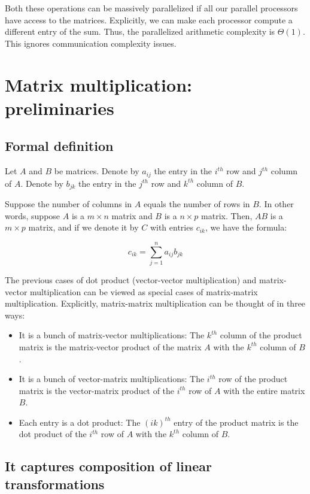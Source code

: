 \documentclass[10pt]{amsart}
\begin{document}
Both these operations can be massively parallelized if all our
parallel processors have access to the matrices. Explicitly, we can
make each processor compute a different entry of the sum. Thus, the
parallelized arithmetic complexity is $\Theta(1)$. This ignores
communication complexity issues.

\section{Matrix multiplication: preliminaries}

\subsection{Formal definition}

Let $A$ and $B$ be matrices. Denote by $a_{ij}$ the entry in the
$i^{th}$ row and $j^{th}$ column of $A$. Denote by $b_{jk}$ the entry
in the $j^{th}$ row and $k^{th}$ column of $B$.

Suppose the number of columns in $A$ equals the number of rows in
$B$. In other words, suppose $A$ is a $m \times n$ matrix and $B$ is a
$n \times p$ matrix. Then, $AB$ is a $m \times p$ matrix, and if we
denote it by $C$ with entries $c_{ik}$, we have the formula:

$$c_{ik} = \sum_{j=1}^n a_{ij}b_{jk}$$

The previous cases of dot product (vector-vector multiplication) and
matrix-vector multiplication can be viewed as special cases of
matrix-matrix multiplication. Explicitly, matrix-matrix multiplication
can be thought of in three ways:

\begin{itemize}
\item It is a bunch of matrix-vector multiplications: The $k^{th}$
  column of the product matrix is the matrix-vector product of the
  matrix $A$ with the $k^{th}$ column of $B$.
\item It is a bunch of vector-matrix multiplications: The $i^{th}$ row
  of the product matrix is the vector-matrix product of the $i^{th}$
  row of $A$ with the entire matrix $B$.
\item Each entry is a dot product: The $(ik)^{th}$ entry of the
  product matrix is the dot product of the $i^{th}$ row of $A$ with
  the $k^{th}$ column of $B$.
\end{itemize}

\subsection{It captures composition of linear transformations}
\end{document}
